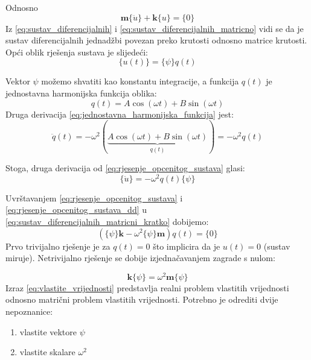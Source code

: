 \documentclass{rgn}
\newcommand\mm{\mathbf{m}}
\newcommand\kk{\mathbf{k}}
\begin{document}
Odnosno
\begin{equation}\label{eq:sustav_diferencijalnih_matricni_kratko}
    \mm\{\ddot{u}\}+\kk\{u\}=\{0\}
\end{equation}
Iz \eqref{eq:sustav_diferencijalnih} i \eqref{eq:sustav_diferencijalnih_matricno}
vidi se da je sustav diferencijalnih jednadžbi povezan preko krutosti odnosno
matrice krutosti. Opći oblik rješenja sustava je slijedeći:
\begin{equation}\label{eq:rjesenje_opcenitog_sustava}
    \{u(t)\} = \{\psi\}q(t)
\end{equation}

Vektor $\psi$ možemo shvatiti kao konstantu integracije, a funkcija $q(t)$ je
jednostavna harmonijska funkcija oblika:
\begin{equation}\label{eq:jednostavna_harmonijska_funkcija}
    q(t)=A\cos(\omega t) + B\sin(\omega t)
\end{equation}
Druga derivacija \eqref{eq:jednostavna_harmonijska_funkcija} jest:
\begin{equation}\label{eq:jednostavna_harmonijska_funkcija_dd}
    \ddot{q}(t)=-\omega^2(
    \underbrace{
        A\cos(\omega t) + B\sin(\omega t)
    }_{\text{$q(t)$}}
    )
    =-\omega^2q(t)
\end{equation}

Stoga, druga derivacija od \eqref{eq:rjesenje_opcenitog_sustava} glasi:
\begin{equation}\label{eq:rjesenje_opcenitog_sustava_dd}
    \{\ddot{u}\}=-\omega^2q(t)\{\psi\}
\end{equation}

Uvrštavanjem \eqref{eq:rjesenje_opcenitog_sustava} i \eqref{eq:rjesenje_opcenitog_sustava_dd}
u \eqref{eq:sustav_diferencijalnih_matricni_kratko} dobijemo:
\begin{equation}
    (\{\psi\}\kk-\omega^2\{\psi\}\mm)q(t)=\{0\}
\end{equation}
Prvo trivijalno rješenje je za $q(t)=0$ što implicira da je $u(t)=0$ (sustav
miruje). Netrivijalno rješenje se dobije izjednačavanjem zagrade s nulom:

\begin{equation}\label{eq:vlastite_vrijednosti}
    \kk\{\psi\}=\omega^2\mm\{\psi\}
\end{equation}
Izraz \eqref{eq:vlastite_vrijednosti} predstavlja realni problem vlastitih
vrijednosti odnosno matrični problem vlastitih vrijednosti. Potrebno je odrediti
dvije nepoznanice: 
\begin{enumerate}
    \item vlastite vektore $\psi$
    \item vlastite skalare $\omega^2$
\end{enumerate}
\end{document}
